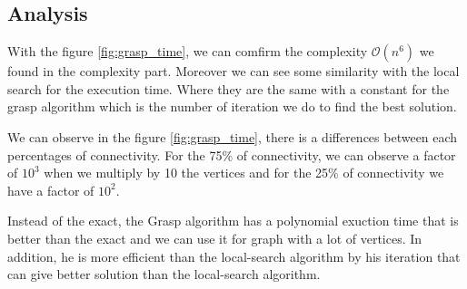 
\subsection{Analysis}

With the figure \ref{fig:grasp_time}, we can comfirm the complexity $\mathcal{O}(n^6)$ we found in the complexity part.
Moreover we can see some similarity with the local search for the execution time. Where they are the same with a constant for the grasp algorithm 
which is the number of iteration we do to find the best solution.
\bigskip

We can observe in the figure \ref{fig:grasp_time}, there is a differences between each percentages of connectivity.
For the 75\% of connectivity, we can observe a factor of $10^3$ when we multiply by 10 the vertices and for the 25\% of connectivity
we have a factor of $10^2$.
\bigskip

Instead of the exact, the Grasp algorithm has a polynomial exuction time that is better than the exact and we can use it for graph with a lot of vertices.
In addition, he is more efficient than the local-search algorithm by his iteration that can give better solution than the local-search algorithm.